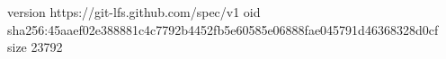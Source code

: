 version https://git-lfs.github.com/spec/v1
oid sha256:45aaef02e388881c4c7792b4452fb5e60585e06888fae045791d46368328d0cf
size 23792
